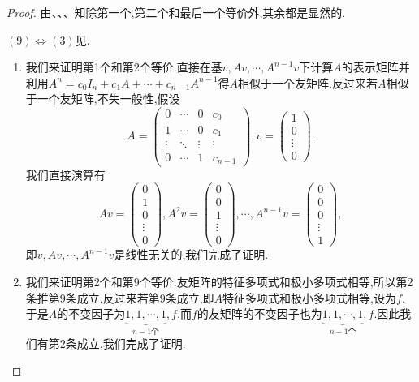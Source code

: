 \documentclass[../../main.tex]{subfiles}%
\begin{document}
\begin{proof}

由、、、知除第一个,第二个和最后一个等价外,其余都是显然的.

$(9)\iff (3)$见.
\begin{enumerate}[(1)]
\item 我们来证明第1个和第2个等价.直接在基$v,Av,\cdots,A^{n-1}v$下计算$A$的表示矩阵并利用$A^n=c_0I_n+c_1A+\cdots+c_{n-1}A^{n-1}$得$A$相似于一个友矩阵.反过来若$A$相似于一个友矩阵,不失一般性,假设
$$A=\begin{pmatrix}0&\cdots&0&c_0\\1&\cdots&0&c_1\\\vdots&\ddots&\vdots&\vdots\\0&\cdots&1&c_{n-1}\end{pmatrix},v=\begin{pmatrix}1\\0\\\vdots\\0\end{pmatrix}.$$
我们直接演算有
$$Av=\begin{pmatrix}0\\1\\0\\\vdots\\0\end{pmatrix},A^2v=\begin{pmatrix}0\\0\\1\\\vdots\\0\end{pmatrix},\cdots,A^{n-1}v=\begin{pmatrix}0\\0\\0\\\vdots\\1\end{pmatrix},$$
即$v,Av,\cdots,A^{n-1}v$是线性无关的,我们完成了证明.

\item 我们来证明第2个和第9个等价.友矩阵的特征多项式和极小多项式相等,所以第2条推第9条成立.反过来若第9条成立,即$A$特征多项式和极小多项式相等,设为$f$.于是$A$的不变因子为$\underbrace{1,1,\cdots,1}_{n-1个},f$.而$f$的友矩阵的不变因子也为$\underbrace{1,1,\cdots,1}_{n-1个},f$.因此我们有第2条成立,我们完成了证明.


\end{enumerate}
\end{proof}
\end{document}
